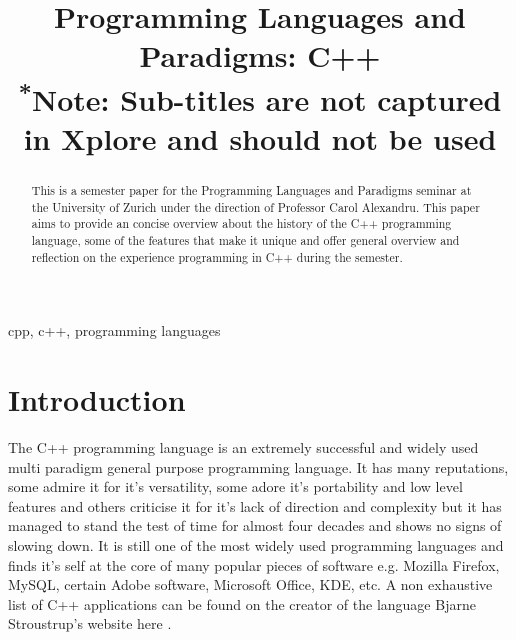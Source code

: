 \documentclass[conference, a4paper]{IEEEtran}
\begin{document}
\title{Programming Languages and Paradigms: C++\\
{\footnotesize \textsuperscript{*}Note: Sub-titles are not captured in Xplore and
should not be used}
}

\author{
}

\maketitle

\begin{abstract}
This is a semester paper for the Programming Languages and Paradigms seminar at the University of Zurich under the direction of Professor Carol Alexandru. This paper aims to provide an concise overview about the history of the C++ programming language, some of the features that make it unique and offer general overview and reflection on the experience programming in C++ during the semester.\\
\end{abstract}

\begin{IEEEkeywords}
cpp, c++, programming languages
\end{IEEEkeywords}

\section{Introduction}
The C++ programming language is an extremely successful and widely used multi paradigm general purpose programming language. It has many reputations, some admire it for it's versatility, some adore it's portability and low level features and others criticise it for it's lack of direction and complexity but it has managed to stand the test of time for almost four decades and shows no signs of slowing down. It is still one of the most widely used programming languages and finds it's self at the core of many popular pieces of software e.g. Mozilla Firefox, MySQL, certain Adobe software, Microsoft Office, KDE, etc. A non exhaustive list of C++ applications can be found on the creator of the language Bjarne Stroustrup's website here \cite{cppapplications} .
\end{document}

